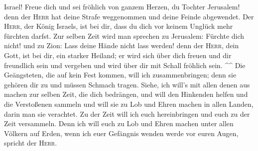 Israel! Freue dich und sei fröhlich von ganzem Herzen, du Tochter
Jerusalem!  denn der \textsc{Herr} hat deine Strafe
weggenommen und deine Feinde abgewendet. Der \textsc{Herr}, der König
Israels, ist bei dir, dass du dich vor keinem Unglück mehr fürchten
darfst.  Zur selben Zeit wird man sprechen zu Jerusalem:
Fürchte dich nicht! und zu Zion: Lass deine Hände nicht lass werden!
 denn der \textsc{Herr}, dein Gott, ist bei dir, ein
starker Heiland; er wird sich über dich freuen und dir freundlich sein
und vergeben und wird über dir mit Schall fröhlich sein. \^{}\^{}
 Die Geängsteten, die auf kein Fest kommen, will ich
zusammenbringen; denn sie gehören dir zu und müssen Schmach tragen.
 Siehe, ich will's mit allen denen aus machen zur selben
Zeit, die dich bedrängen, und will den Hinkenden helfen und die
Verstoßenen sammeln und will sie zu Lob und Ehren machen in allen
Landen, darin man sie verachtet.  Zu der Zeit will ich
euch hereinbringen und euch zu der Zeit versammeln. Denn ich will euch
zu Lob und Ehren machen unter allen Völkern auf Erden, wenn ich euer
Gefängnis wenden werde vor euren Augen, spricht der \textsc{Herr}.
